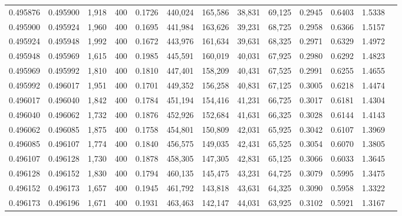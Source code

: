 \begin{tabular}{rrrrrrrrrrrrr}
0.495876 & 0.495900 &  1,918 & 400 &                                     0.1726 & 440,024 & 165,586 &  38,831 &  69,125 & 0.2945 & 0.6403 & 1.5338 \\
0.495900 & 0.495924 &  1,960 & 400 &                                     0.1695 & 441,984 & 163,626 &  39,231 &  68,725 & 0.2958 & 0.6366 & 1.5157 \\
0.495924 & 0.495948 &  1,992 & 400 &                                     0.1672 & 443,976 & 161,634 &  39,631 &  68,325 & 0.2971 & 0.6329 & 1.4972 \\
0.495948 & 0.495969 &  1,615 & 400 &                                     0.1985 & 445,591 & 160,019 &  40,031 &  67,925 & 0.2980 & 0.6292 & 1.4823 \\
0.495969 & 0.495992 &  1,810 & 400 &                                     0.1810 & 447,401 & 158,209 &  40,431 &  67,525 & 0.2991 & 0.6255 & 1.4655 \\
0.495992 & 0.496017 &  1,951 & 400 &                                     0.1701 & 449,352 & 156,258 &  40,831 &  67,125 & 0.3005 & 0.6218 & 1.4474 \\
0.496017 & 0.496040 &  1,842 & 400 &                                     0.1784 & 451,194 & 154,416 &  41,231 &  66,725 & 0.3017 & 0.6181 & 1.4304 \\
0.496040 & 0.496062 &  1,732 & 400 &                                     0.1876 & 452,926 & 152,684 &  41,631 &  66,325 & 0.3028 & 0.6144 & 1.4143 \\
0.496062 & 0.496085 &  1,875 & 400 &                                     0.1758 & 454,801 & 150,809 &  42,031 &  65,925 & 0.3042 & 0.6107 & 1.3969 \\
0.496085 & 0.496107 &  1,774 & 400 &                                     0.1840 & 456,575 & 149,035 &  42,431 &  65,525 & 0.3054 & 0.6070 & 1.3805 \\
0.496107 & 0.496128 &  1,730 & 400 &                                     0.1878 & 458,305 & 147,305 &  42,831 &  65,125 & 0.3066 & 0.6033 & 1.3645 \\
0.496128 & 0.496152 &  1,830 & 400 &                                     0.1794 & 460,135 & 145,475 &  43,231 &  64,725 & 0.3079 & 0.5995 & 1.3475 \\
0.496152 & 0.496173 &  1,657 & 400 &                                     0.1945 & 461,792 & 143,818 &  43,631 &  64,325 & 0.3090 & 0.5958 & 1.3322 \\
0.496173 & 0.496196 &  1,671 & 400 &                                     0.1931 & 463,463 & 142,147 &  44,031 &  63,925 & 0.3102 & 0.5921 & 1.3167 \\

\end{tabular}
